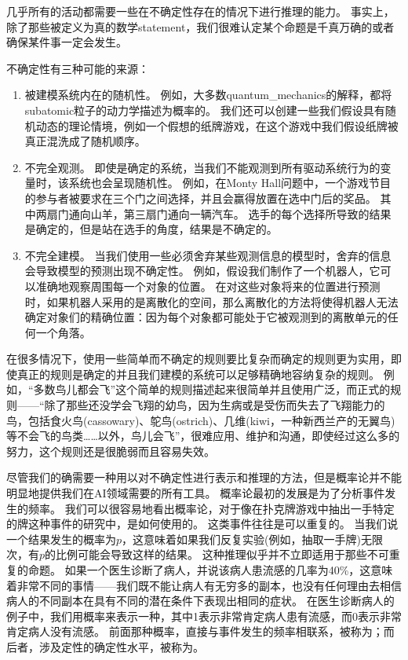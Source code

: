 几乎所有的活动都需要一些在不确定性存在的情况下进行推理的能力。
事实上，除了那些被定义为真的数学\gls{statement}，我们很难认定某个命题是千真万确的或者确保某件事一定会发生。

不确定性有三种可能的来源：

\begin{enumerate}
\item 被建模系统内在的随机性。
例如，大多数\gls{quantum_mechanics}的解释，都将\gls{subatomic}粒子的动力学描述为概率的。
我们还可以创建一些我们假设具有随机动态的理论情境，例如一个假想的纸牌游戏，在这个游戏中我们假设纸牌被真正混洗成了随机顺序。

\item 不完全观测。
即使是确定的系统，当我们不能观测到所有驱动系统行为的变量时，该系统也会呈现随机性。
例如，在Monty Hall问题中，一个游戏节目的参与者被要求在三个门之间选择，并且会赢得放置在选中门后的奖品。
其中两扇门通向山羊，第三扇门通向一辆汽车。
选手的每个选择所导致的结果是确定的，但是站在选手的角度，结果是不确定的。

\item 不完全建模。
当我们使用一些必须舍弃某些观测信息的模型时，舍弃的信息会导致模型的预测出现不确定性。
例如，假设我们制作了一个机器人，它可以准确地观察周围每一个对象的位置。
在对这些对象将来的位置进行预测时，如果机器人采用的是离散化的空间，那么离散化的方法将使得机器人无法确定对象们的精确位置：因为每个对象都可能处于它被观测到的离散单元的任何一个角落。
\end{enumerate}


在很多情况下，使用一些简单而不确定的规则要比复杂而确定的规则更为实用，即使真正的规则是确定的并且我们建模的系统可以足够精确地容纳复杂的规则。
例如，``多数鸟儿都会飞''这个简单的规则描述起来很简单并且使用广泛，而正式的规则——``除了那些还没学会飞翔的幼鸟，因为生病或是受伤而失去了飞翔能力的鸟，包括食火鸟(cassowary)、鸵鸟(ostrich)、几维(kiwi，一种新西兰产的无翼鸟)等不会飞的鸟类……以外，鸟儿会飞''，很难应用、维护和沟通，即使经过这么多的努力，这个规则还是很脆弱而且容易失效。

尽管我们的确需要一种用以对不确定性进行表示和推理的方法，但是概率论并不能明显地提供我们在\gls{AI}领域需要的所有工具。
概率论最初的发展是为了分析事件发生的频率。
我们可以很容易地看出概率论，对于像在扑克牌游戏中抽出一手特定的牌这种事件的研究中，是如何使用的。
这类事件往往是可以重复的。
当我们说一个结果发生的概率为$p$，这意味着如果我们反复实验(例如，抽取一手牌)无限次，有$p$的比例可能会导致这样的结果。
这种推理似乎并不立即适用于那些不可重复的命题。
如果一个医生诊断了病人，并说该病人患流感的几率为40\%，这意味着非常不同的事情——我们既不能让病人有无穷多的副本，也没有任何理由去相信病人的不同副本在具有不同的潜在条件下表现出相同的症状。
在医生诊断病人的例子中，我们用概率来表示一种，其中1表示非常肯定病人患有流感，而0表示非常肯定病人没有流感。
前面那种概率，直接与事件发生的频率相联系，被称为；而后者，涉及定性的确定性水平，被称为。

